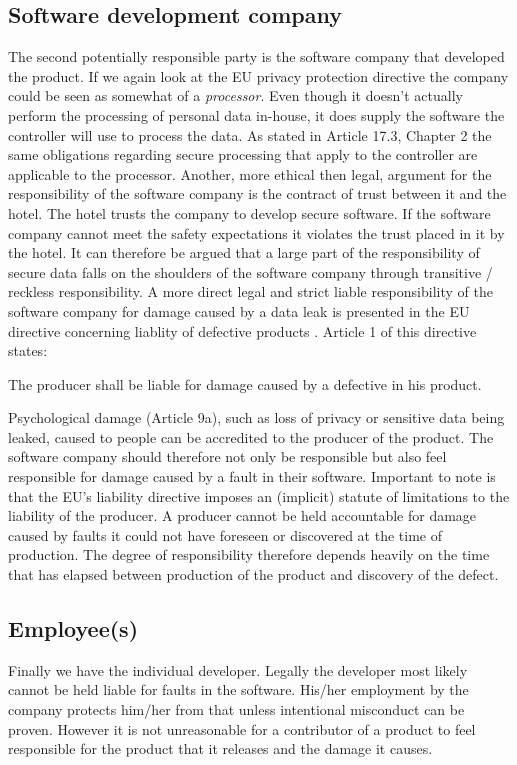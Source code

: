 \subsection*{Software development company}
The second potentially responsible party is the software company that developed the product. If we again look at the EU privacy protection directive \cite{privacy_directive} the company could be seen as somewhat of a  \textit{processor}. Even though it doesn't actually perform the processing of personal data in-house, it does supply the software the controller will use to process the data. As stated in Article 17.3, Chapter 2 the same obligations regarding secure processing that apply to the controller are applicable to the processor. Another, more ethical then legal, argument for the responsibility of the software company is the contract of trust between it and the hotel. The hotel trusts the company to develop secure software. If the software company cannot meet the safety expectations it violates the trust placed in it by the hotel. It can therefore be argued that a large part of the responsibility of secure data falls on the shoulders of the software company through transitive / reckless responsibility. A more direct legal and strict liable responsibility of the software company for damage caused by a data leak is presented in the EU directive concerning liablity of defective products \cite{liability_directive}. Article 1 of this directive states:

\begin{displayquote}The producer shall be liable for damage caused by a defective in his product.\end{displayquote}

Psychological damage (Article 9a), such as loss of privacy or sensitive data being leaked, caused to people can be accredited to the producer of the product. The software company should therefore not only be responsible but also feel responsible for damage caused by a fault in their software.
Important to note is that the EU's liability directive \cite{liability_directive} imposes an (implicit) statute of limitations to the liability of the producer. A producer cannot be held accountable for damage caused by faults it could not have foreseen or discovered at the time of production. The degree of responsibility therefore depends heavily on the time that has elapsed between production of the product and discovery of the defect.

\subsection*{Employee(s)}
Finally we have the individual developer. Legally the developer most likely cannot be held liable for faults in the software. His/her employment by the company protects him/her from that unless intentional misconduct can be proven. However it is not unreasonable for a contributor of a product to feel responsible for the product that it releases and the damage it causes.

